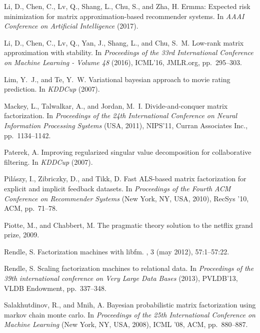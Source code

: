 \documentclass{article}
\begin{document}
\begin{thebibliography}{10}
{\sc Li, D., Chen, C., Lv, Q., Shang, L., Chu, S., and Zha, H.}
\newblock Ermma: Expected risk minimization for matrix approximation-based
  recommender systems.
\newblock In {\em AAAI Conference on Artificial Intelligence\/} (2017).

{\sc Li, D., Chen, C., Lv, Q., Yan, J., Shang, L., and Chu, S.~M.}
\newblock Low-rank matrix approximation with stability.
\newblock In {\em Proceedings of the 33rd International Conference on Machine
  Learning - Volume 48\/} (2016), ICML'16, JMLR.org, pp.~295--303.

{\sc Lim, Y.~J., and Te, Y.~W.}
\newblock Variational bayesian approach to movie rating prediction.
\newblock In {\em KDDCup\/} (2007).

{\sc Mackey, L., Talwalkar, A., and Jordan, M.~I.}
\newblock Divide-and-conquer matrix factorization.
\newblock In {\em Proceedings of the 24th International Conference on Neural
  Information Processing Systems\/} (USA, 2011), NIPS'11, Curran Associates
  Inc., pp.~1134--1142.

{\sc Paterek, A.}
\newblock Improving regularized singular value decomposition for collaborative
  filtering.
\newblock In {\em KDDCup\/} (2007).

{\sc Pil\'{a}szy, I., Zibriczky, D., and Tikk, D.}
\newblock Fast {ALS}-based matrix factorization for explicit and implicit
  feedback datasets.
\newblock In {\em Proceedings of the Fourth ACM Conference on Recommender
  Systems\/} (New York, NY, USA, 2010), RecSys '10, ACM, pp.~71--78.

{\sc Piotte, M., and Chabbert, M.}
\newblock The pragmatic theory solution to the netflix grand prize, 2009.

{\sc Rendle, S.}
\newblock Factorization machines with libfm.
, 3 (may 2012), 57:1--57:22.

{\sc Rendle, S.}
\newblock Scaling factorization machines to relational data.
\newblock In {\em Proceedings of the 39th international conference on Very
  Large Data Bases\/} (2013), PVLDB'13, VLDB Endowment, pp.~337--348.

{\sc Salakhutdinov, R., and Mnih, A.}
\newblock Bayesian probabilistic matrix factorization using markov chain monte
  carlo.
\newblock In {\em Proceedings of the 25th International Conference on Machine
  Learning\/} (New York, NY, USA, 2008), ICML '08, ACM, pp.~880--887.


\end{thebibliography}
\end{document}
